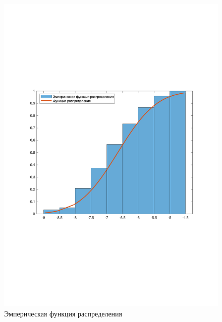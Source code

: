 \begin{figure}[H]
    \centering
    \includegraphics[trim=0.5cm 9cm 0.5cm 8cm]{img/emperical_graph.pdf}
    \caption{Эмперическая функция распределения}
\end{figure}
